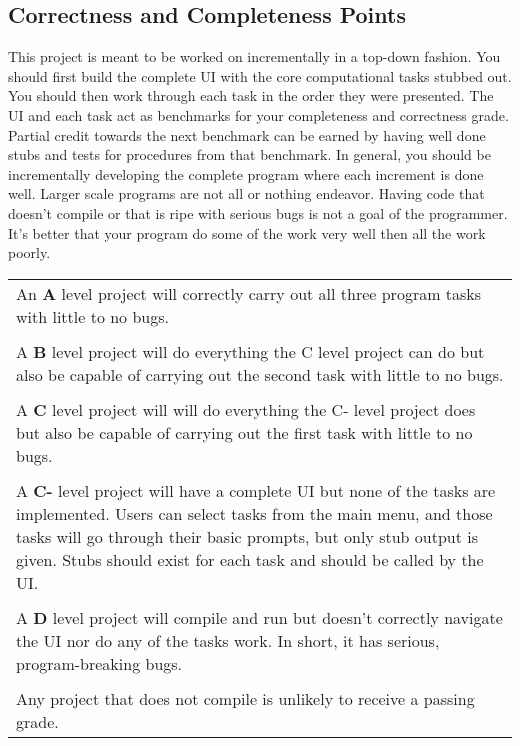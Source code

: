\documentclass[]{tufte-handout}
\begin{document}
\subsection{Correctness and Completeness Points}

This project is meant to be worked on incrementally in a top-down fashion. You should first build the complete UI with the core computational tasks stubbed out. You should then work through each task in the order they were presented. The UI and each task act as benchmarks for your completeness and correctness grade. Partial credit towards the next benchmark can be earned by having well done stubs and tests for procedures from that benchmark. In general, you should be incrementally developing the complete program where each increment is done well. Larger scale programs are not all or nothing endeavor. Having code that doesn't compile or that is ripe with serious bugs is not a goal of the programmer. It's better that your program do some of the work very well then all the work poorly.

\begin{center}
  \begin{tabular}{p{3.5in}}
    An \textbf{A} level project will correctly carry out all three program tasks with little to no bugs. \\ \\
    A \textbf{B} level project will do everything the C level project can do but also be capable of carrying out the second task with little to no bugs. \\ \\
    A \textbf{C} level project will will do everything the C- level project does but also be capable of carrying out the first task with little to no bugs. \\ \\
    A \textbf{C-} level project will have a complete UI but none of the tasks are implemented. Users can select tasks from the main menu, and those tasks will go through their basic prompts, but only stub output is given. Stubs should exist for each task and should be called by the UI. \\ \\
    A \textbf{D} level project will compile and run but doesn't correctly navigate the UI nor do any of the tasks work. In short, it has serious, program-breaking bugs. \\ \\
    Any project that does not compile is unlikely to receive a passing grade.
  \end{tabular}
\end{center}
\end{document}
